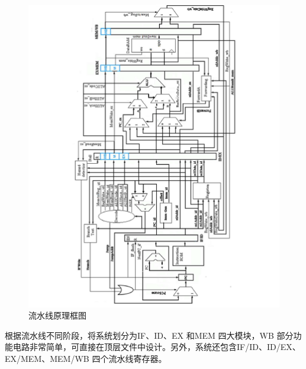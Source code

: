\documentclass{../source/zjureport}
\begin{document}
        \begin{figure}[H]
            \centering
            \includegraphics[width = \textwidth]{figure/流水线原理框图.png}
            \caption{流水线原理框图}
            \label{流水线原理框图}
        \end{figure}

        根据流水线不同阶段，将系统划分为IF、ID、EX 和MEM 四大模块，WB 部分功能电路非常简单，可直接在顶层文件中设计。另外，系统还包含IF/ID、ID/EX、EX/MEM、MEM/WB 四个流水线寄存器。
\end{document}
